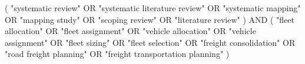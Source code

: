 (
    "systematic review"
        OR "systematic literature review"
        OR "systematic mapping"
        OR "mapping study"
        OR "scoping review"
        OR "literature review"
) AND (
    "fleet allocation"
        OR "fleet assignment"
        OR "vehicle allocation"
        OR "vehicle assignment"
        OR "fleet sizing"
        OR "fleet selection"
        OR "freight consolidation"
        OR "road freight planning"
        OR "freight transportation planning"
)

